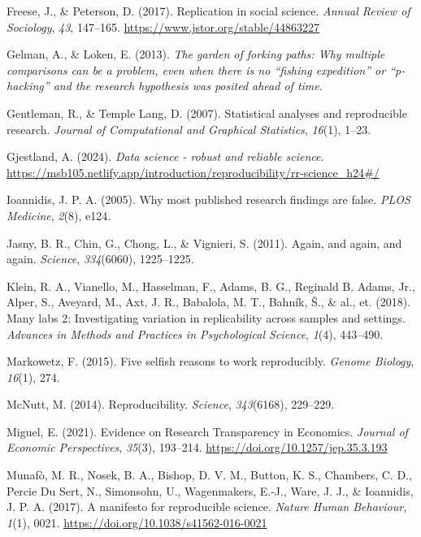 \documentclass[
  a4paper,
]{article}
\newlength{\cslhangindent}
\newenvironment{CSLReferences}[2] %
 {\begin{list}{}{%
  \setlength{\itemindent}{0pt}
  \setlength{\leftmargin}{0pt}
  \setlength{\parsep}{0pt}
  \ifodd #1
   \setlength{\leftmargin}{\cslhangindent}
   \setlength{\itemindent}{-1\cslhangindent}
  \fi
  \setlength{\itemsep}{#2\baselineskip}}}
 {\end{list}}
\begin{document}
\begin{CSLReferences}{1}{0}
Freese, J., \& Peterson, D. (2017). Replication in social science.
\emph{Annual Review of Sociology}, \emph{43}, 147--165.
\url{https://www.jstor.org/stable/44863227}

Gelman, A., \& Loken, E. (2013). \emph{The garden of forking paths: Why
multiple comparisons can be a problem, even when there is no
{``}{fi}shing expedition{''} or {``}p-hacking{''} and the research
hypothesis was posited ahead of time}.

Gentleman, R., \& Temple Lang, D. (2007). Statistical analyses and
reproducible research. \emph{Journal of Computational and Graphical
Statistics}, \emph{16}(1), 1--23.

Gjestland, A. (2024). \emph{Data science - robust and reliable science}.
\url{https://msb105.netlify.app/introduction/reproducibility/rr-science_h24\#/}

Ioannidis, J. P. A. (2005). Why most published research findings are
false. \emph{PLOS Medicine}, \emph{2}(8), e124.

Jasny, B. R., Chin, G., Chong, L., \& Vignieri, S. (2011). Again, and
again, and again. \emph{Science}, \emph{334}(6060), 1225--1225.

Klein, R. A., Vianello, M., Hasselman, F., Adams, B. G., Reginald B.
Adams, Jr., Alper, S., Aveyard, M., Axt, J. R., Babalola, M. T., Bahník,
Š., \& al., et. (2018). Many labs 2: Investigating variation in
replicability across samples and settings. \emph{Advances in Methods and
Practices in Psychological Science}, \emph{1}(4), 443--490.

Markowetz, F. (2015). Five selfish reasons to work reproducibly.
\emph{Genome Biology}, \emph{16}(1), 274.

McNutt, M. (2014). Reproducibility. \emph{Science}, \emph{343}(6168),
229--229.

Miguel, E. (2021). Evidence on Research Transparency in Economics.
\emph{Journal of Economic Perspectives}, \emph{35}(3), 193--214.
\url{https://doi.org/10.1257/jep.35.3.193}

Munafò, M. R., Nosek, B. A., Bishop, D. V. M., Button, K. S., Chambers,
C. D., Percie Du Sert, N., Simonsohn, U., Wagenmakers, E.-J., Ware, J.
J., \& Ioannidis, J. P. A. (2017). A manifesto for reproducible science.
\emph{Nature Human Behaviour}, \emph{1}(1), 0021.
\url{https://doi.org/10.1038/s41562-016-0021}


\end{CSLReferences}
\end{document}
